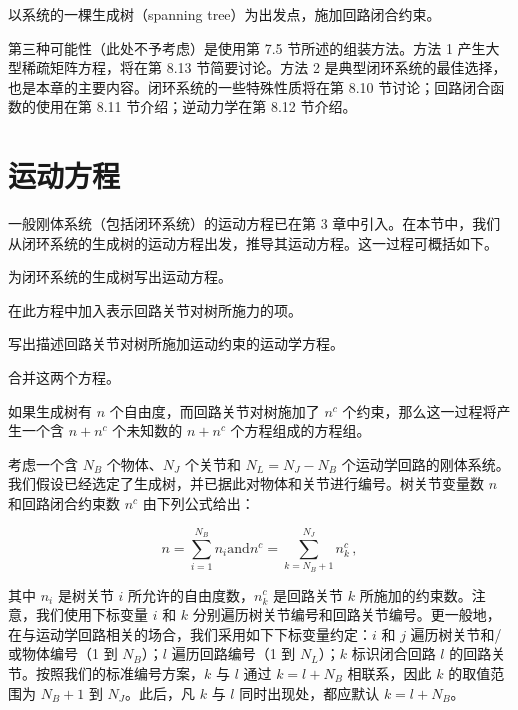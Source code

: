 \documentclass[10pt,a4paper]{book}
\theoremstyle{thmstyle} %
\theoremstyle{defstyle} %
\theoremstyle{prostyle} %
\begin{document}
以系统的一棵生成树（spanning tree）为出发点，施加回路闭合约束。



第三种可能性（此处不予考虑）是使用第 7.5 节所述的组装方法。方法 1 产生大型稀疏矩阵方程，将在第 8.13 节简要讨论。方法 2 是典型闭环系统的最佳选择，也是本章的主要内容。闭环系统的一些特殊性质将在第 8.10 节讨论；回路闭合函数的使用在第 8.11 节介绍；逆动力学在第 8.12 节介绍。



\section{运动方程}





一般刚体系统（包括闭环系统）的运动方程已在第 3 章中引入。在本节中，我们从闭环系统的生成树的运动方程出发，推导其运动方程。这一过程可概括如下。



为闭环系统的生成树写出运动方程。



在此方程中加入表示回路关节对树所施力的项。



写出描述回路关节对树所施加运动约束的运动学方程。



合并这两个方程。



如果生成树有 $n$ 个自由度，而回路关节对树施加了 $n^{c}$ 个约束，那么这一过程将产生一个含 $n+n^{c}$ 个未知数的 $n+n^{c}$ 个方程组成的方程组。



考虑一个含 $N_{B}$ 个物体、$N_{J}$ 个关节和 $N_{L} = N_{J} - N_{B}$ 个运动学回路的刚体系统。我们假设已经选定了生成树，并已据此对物体和关节进行编号。树关节变量数 $n$ 和回路闭合约束数 $n^{c}$ 由下列公式给出：



$$
n = \sum _ { i = 1 } ^{N _ { B} } n _ { i }  \mathrm { a n d }  n ^{c} = \sum _ { k = N _ { B } + 1 } ^{N _ { J} } n _ { k } ^{c} \, ,
$$



其中 $n_{i}$ 是树关节 $i$ 所允许的自由度数，$n_{k}^{c}$ 是回路关节 $k$ 所施加的约束数。注意，我们使用下标变量 $i$ 和 $k$ 分别遍历树关节编号和回路关节编号。更一般地，在与运动学回路相关的场合，我们采用如下下标变量约定：$i$ 和 $j$ 遍历树关节和/或物体编号（1 到 $N_{B}$）；$l$ 遍历回路编号（1 到 $N_{L}$）；$k$ 标识闭合回路 $l$ 的回路关节。按照我们的标准编号方案，$k$ 与 $l$ 通过 $k = l + N_{B}$ 相联系，因此 $k$ 的取值范围为 $N_{B} + 1$ 到 $N_{J}$。此后，凡 $k$ 与 $l$ 同时出现处，都应默认 $k = l + N_{B}$。
\end{document}
